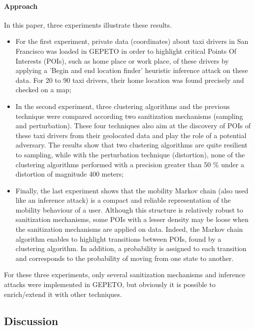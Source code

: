 \paragraph{Approach}
In this paper, three experiments illustrate these results.

\begin{itemize}

\item For the first experiment, private data (coordinates) about taxi drivers in San Francisco was loaded in GEPETO in order to highlight critical Points Of Interests (POIs), such as home place or work place, of these drivers by applying a 'Begin and end location finder' heuristic inference attack on these data. For 20 to 90 taxi drivers, their home location was found precisely and checked on a map;

\item In the second experiment, three clustering algorithms and the previous technique were compared according two sanitization mechanisms (sampling and perturbation). These four techniques also aim at the discovery of POIs of these taxi drivers from their geolocated data and play the role of a potential adversary. The results show that two clustering algorithms are quite resilient to sampling, while with the perturbation technique (distortion), none of the clustering algorithms performed with a precision greater than 50 \% under a distortion of magnitude 400 meters;

\item Finally, the last experiment shows that the mobility Markov chain (also used like an inference attack) is a compact and reliable representation of the mobility behaviour of a user. Although this structure is relatively robust to sanitization mechanisms, some POIs with a lesser density may be loose when the sanitization mechanisms are applied on data. Indeed, the Markov chain algorithm enables to highlight transitions between POIs, found by a clustering algorithm. In addition, a probability is assigned to each transition and corresponds to the probability of moving from one state to another.

\end{itemize}

For these three experiments, only several sanitization mechanisms and inference attacks were implemented in GEPETO, but obviously it is possible to enrich/extend it with other techniques.

\subsection{Discussion} \label{lect3-disc}

